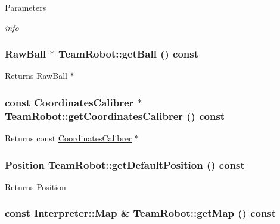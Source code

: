 \begin{DoxyParams}{Parameters}
\item[{\em info}]\end{DoxyParams}
\hypertarget{classTeamRobot_a86dbc3bbf6fdcebd4ae41a6f68d92a15}{
\subsubsection[{getBall}]{\setlength{\rightskip}{0pt plus 5cm}RawBall $\ast$ TeamRobot::getBall () const}}
\label{classTeamRobot_a86dbc3bbf6fdcebd4ae41a6f68d92a15}
\begin{DoxyReturn}{Returns}
RawBall $\ast$ 
\end{DoxyReturn}
\hypertarget{classTeamRobot_a3ef7d4538226085ed4d92b8bd2fce67d}{
\subsubsection[{getCoordinatesCalibrer}]{\setlength{\rightskip}{0pt plus 5cm}const {\bf CoordinatesCalibrer} $\ast$ TeamRobot::getCoordinatesCalibrer () const}}
\label{classTeamRobot_a3ef7d4538226085ed4d92b8bd2fce67d}
\begin{DoxyReturn}{Returns}
const \hyperlink{classCoordinatesCalibrer}{CoordinatesCalibrer} $\ast$ 
\end{DoxyReturn}
\hypertarget{classTeamRobot_acd11ff6d9651a8deddafa5bd9a30865c}{
\subsubsection[{getDefaultPosition}]{\setlength{\rightskip}{0pt plus 5cm}Position TeamRobot::getDefaultPosition () const}}
\label{classTeamRobot_acd11ff6d9651a8deddafa5bd9a30865c}
\begin{DoxyReturn}{Returns}
Position 
\end{DoxyReturn}
\hypertarget{classTeamRobot_a8b5fa0d9f42166fc3339ec901fad5a91}{
\subsubsection[{getMap}]{\setlength{\rightskip}{0pt plus 5cm}const {\bf Interpreter::Map} \& TeamRobot::getMap () const}}

